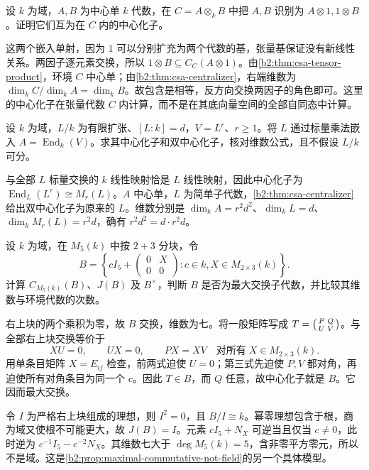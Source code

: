 \begin{exercise}\label{b2:ex:17-tensor-factor-centralizer}
	设 \(k\) 为域，\(A,B\) 为中心单 \(k\) 代数，在 \(C=A\otimes_kB\) 中把 \(A,B\) 识别为 \(A\otimes1,1\otimes B\)。证明它们互为在 \(C\) 内的中心化子。
\end{exercise}
\begin{solution}
	这两个嵌入单射，因为 \(1\) 可以分别扩充为两个代数的基，张量基保证没有新线性关系。两因子逐元素交换，所以 \(1\otimes B\subseteq C_C(A\otimes1)\)。由\cref{b2:thm:csa-tensor-product}，环境 \(C\) 中心单；由\cref{b2:thm:csa-centralizer}，右端维数为 \(\dim_kC/\dim_kA=\dim_kB\)。故包含是相等，反方向交换两因子的角色即可。这里的中心化子在张量代数 \(C\) 内计算，而不是在其底向量空间的全部自同态中计算。
\end{solution}

\begin{exercise}\label{b2:ex:17-field-centralizer}
	设 \(k\) 为域，\(L/k\) 为有限扩张、\([L:k]=d\)，\(V=L^r\)、\(r\ge1\)。将 \(L\) 通过标量乘法嵌入 \(A=\operatorname{End}_k(V)\)。求其中心化子和双中心化子，核对维数公式，且不假设 \(L/k\) 可分。
\end{exercise}
\begin{solution}
	与全部 \(L\) 标量交换的 \(k\) 线性映射恰是 \(L\) 线性映射，因此中心化子为 \(\operatorname{End}_L(L^r)\cong M_r(L)\)。\(A\) 中心单，\(L\) 为简单子代数，\cref{b2:thm:csa-centralizer}给出双中心化子为原来的 \(L\)。维数分别是 \(\dim_kA=r^2d^2\)、\(\dim_kL=d\)、\(\dim_kM_r(L)=r^2d\)，确有 \(r^2d^2=d\cdot r^2d\)。
\end{solution}

\begin{exercise}\label{b2:ex:17-large-commutative-subalgebra}
	设 \(k\) 为域，在 \(M_5(k)\) 中按 \(2+3\) 分块，令
	\[
		B=\left\{cI_5+\begin{pmatrix}0&X\\0&0\end{pmatrix}:c\in k, X\in M_{2\times3}(k)\right\}.
	\]
	计算 \(C_{M_5(k)}(B)\)、\(J(B)\) 及 \(B^\times\)，判断 \(B\) 是否为最大交换子代数，并比较其维数与环境代数的次数。
\end{exercise}
\begin{solution}
	右上块的两个乘积为零，故 \(B\) 交换，维数为七。将一般矩阵写成 \(T=\begin{psmallmatrix}P&Q\\U&V\end{psmallmatrix}\)。与全部右上块交换等价于
	\[
		XU=0,\qquad UX=0,\qquad PX=XV \quad\text{对所有}\;X\in M_{2\times3}(k).
	\]
	用单条目矩阵 \(X=E_{ij}\) 检查，前两式迫使 \(U=0\)；第三式先迫使 \(P,V\) 都对角，再迫使所有对角条目为同一个 \(c\)。因此 \(T\in B\)，而 \(Q\) 任意，故中心化子就是 \(B\)。它因而最大交换。

	令 \(I\) 为严格右上块组成的理想，则 \(I^2=0\)，且 \(B/I\cong k\)。幂零理想包含于根，商为域又使根不可能更大，故 \(J(B)=I\)。元素 \(cI_5+N_X\) 可逆当且仅当 \(c\ne0\)，此时逆为 \(c^{-1}I_5-c^{-2}N_X\)。其维数七大于 \(\deg M_5(k)=5\)，含非零平方零元，所以不是域。这是\cref{b2:prop:maximal-commutative-not-field}的另一个具体模型。
\end{solution}

